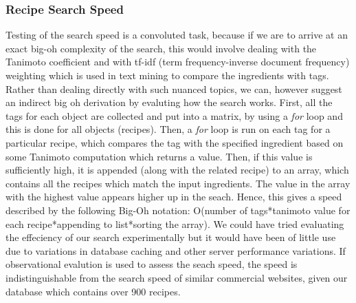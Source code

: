 \subsubsection{Recipe Search Speed}
Testing of the search speed is a convoluted task, because if we are to arrive at an exact big-oh complexity of the search, this would involve dealing with the Tanimoto coefficient and with tf-idf (term frequency-inverse document frequency) weighting which is used in text mining to compare the ingredients with tags. Rather than dealing directly with such nuanced topics, we can, however suggest an indirect big oh derivation by evaluting how the search works.
First, all the tags for each object are collected and put into a matrix, by using a \emph{for} loop and this is done for all objects (recipes).
Then, a \emph{for} loop is run on each tag for a particular recipe, which compares the tag with the specified ingredient based on some Tanimoto computation which returns a value.
Then, if this value is sufficiently high, it is appended (along with the related recipe) to an array, which contains all the recipes which match the input ingredients. The value in the array with the highest value appears higher up in the seach.
Hence, this gives a speed described by the following Big-Oh notation: O(number of tags*tanimoto value for each recipe*appending to list*sorting the array).
We could have tried evaluating the effeciency of our search experimentally but it would have been of little use due to variations in database caching and other server performance variations.
If observational evalution is used to assess the seach speed, the speed is indistinguishable from the search speed of similar commercial websites, given our database which contains over 900 recipes.
